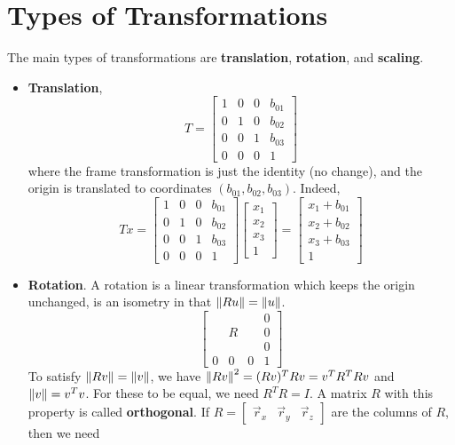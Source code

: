 \documentclass[letterpaper,12pt]{article}
\begin{document}
\section*{Types of Transformations}
The main types of transformations are \textbf{translation}, \textbf{rotation}, and \textbf{scaling}.
\begin{itemize}
    \item \textbf{Translation},
    \begin{equation*}
        T = \begin{bmatrix} 1 & 0 & 0 & b_{01} \\ 0 & 1 & 0 & b_{02} \\ 0 & 0 & 1 & b_{03} \\ 0 & 0 & 0 & 1 \end{bmatrix}
    \end{equation*}
    where the frame transformation is just the identity (no change), and the origin is translated to coordinates $(b_{01}, b_{02}, b_{03})$. Indeed,
    \begin{equation*}
        Tx = \begin{bmatrix} 1 & 0 & 0 & b_{01} \\ 0 & 1 & 0 & b_{02} \\ 0 & 0 & 1 & b_{03} \\ 0 & 0 & 0 & 1 \end{bmatrix} \begin{bmatrix} x_1 \\ x_2 \\ x_3 \\ 1 \end{bmatrix} = \begin{bmatrix} x_1 + b_{01} \\ x_2 + b_{02} \\ x_3 + b_{03} \\ 1 \end{bmatrix}
    \end{equation*}
    \item \textbf{Rotation}. A rotation is a linear transformation which keeps the origin unchanged, is an isometry in that $\left\lVert Ru \right\rVert = \left\lVert u \right\rVert$.
    \begin{equation*}
        \begin{bmatrix} & & & 0 \\ & R & & 0 \\ & & & 0 \\ 0 & 0 & 0 & 1 \end{bmatrix}
    \end{equation*}
    To satisfy $\left\lVert Rv \right\rVert = \left\lVert v \right\rVert$, we have $\left\lVert Rv \right\rVert^2 = (Rv)^T Rv = v^T R^T R v$ and $\left\lVert v \right\rVert = v^T v$. For these to be equal, we need $R^T R = I$. A matrix $R$ with this property is called \textbf{orthogonal}. If $R = \begin{bmatrix} \vec{r}_x & \vec{r}_y & \vec{r}_z \end{bmatrix}$ are the columns of $R$, then we need

\end{itemize}
\end{document}
